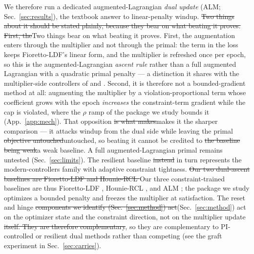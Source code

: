 \documentclass[10pt]{article}
\newcommand{\del}[1]{{\color{red}\sout{#1}}}
\begin{document}
{\color{blue}We therefore run a dedicated augmented-Lagrangian \emph{dual update}
(ALM; Sec.~\ref{sec:results}), the textbook answer to linear-penalty windup. \del{Two
things about it should be stated plainly, because they bear on what beating it
proves. First, the}{Two things bear on what beating it proves. First, the} augmentation enters through the multiplier and not through the
primal: the term in the loss keeps Fioretto-LDF's linear form, and the multiplier
is refreshed once per epoch, so this is the augmented-Lagrangian \emph{ascent
rule} rather than a full augmented Lagrangian with a quadratic primal penalty
\citep{bertsekas1982constrained} --- a distinction it shares with the
multiplier-side controllers of \citet{stooke2020responsive} and
\citet{sohrabi2024pi}. Second, it is therefore not a bounded-gradient method at
all: augmenting the multiplier by a violation-proportional term whose coefficient
grows with the epoch \emph{increases} the constraint-term gradient while the cap
is violated, where the $\rho$ ramp of the package we study bounds it
(App.~\ref{app:mech}). That opposition \del{is what makes}{makes} it the sharper comparison
--- it attacks windup from the dual side while leaving the primal \del{objective
untouched}{untouched}, so beating it cannot be credited to \del{the baseline being weak}{a weak baseline}. A full
augmented-Lagrangian primal remains untested (Sec.~\ref{sec:limits}).}
The resilient baseline \del{instead}{\color{blue} in turn}
represents the modern-controllers family with adaptive constraint
tightness. \del{Our two dual-ascent baselines are Fioretto-LDF
\mbox{\citep{fioretto2020lagrangian}} and Hounie-RCL \mbox{\citep{hounie2023resilient}}}%
{\color{blue}Our three constraint-trained baselines are thus Fioretto-LDF
\citep{fioretto2020lagrangian}, Hounie-RCL \citep{hounie2023resilient}, and ALM
\citep{bertsekas1982constrained}};
the package we study optimizes a bounded penalty and freezes the
multiplier at satisfaction. The reset and hinge \del{components we identify
(Sec.~\ref{sec:method}) act}{\color{blue}(Sec.~\ref{sec:method}) act} on the optimizer state and the constraint
direction, not on the multiplier update\del{ itself. They are therefore
complementary}{\color{blue}, so they are complementary} to PI-controlled or resilient dual methods rather than
competing (see the graft experiment in Sec.~\ref{sec:carries}).
\end{document}
